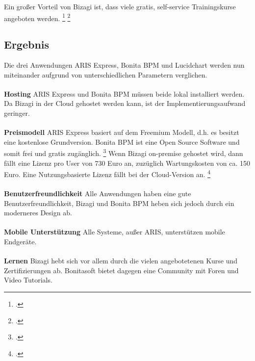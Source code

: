 Ein großer Vorteil von Bizagi ist, dass viele gratis, self-service
Trainingskurse angeboten werden. \footcite{bizagiproscons}
\footcite{bizagilernen}


\subsection{Ergebnis}

Die drei Anwendungen ARIS Express, Bonita BPM und Lucidchart werden nun
miteinander aufgrund von unterschiedlichen Parametern verglichen.
\\
\\
\textbf{Hosting} ARIS Express und Bonita BPM müssen beide lokal installiert
werden. Da Bizagi in der Cloud gehostet werden kann, ist der
Implementierungsaufwand geringer.
\\
\\
\textbf{Preismodell} ARIS Express basiert  auf dem Freemium
Modell, d.h. es besitzt eine kostenlose Grundversion. Bonita BPM ist eine Open
Source Software und somit frei und gratis zugänglich. \footcite{bonitasource}
Wenn Bizagi on-premise gehostet wird, dann fällt eine Lizenz pro User von 730 Euro an, zuzüglich
Wartungskosten von ca. 150 Euro. Eine Nutzungsbasierte Lizenz fällt bei der
Cloud-Version an. \footcite{bizagiprizing}
\\
\\
\textbf{Benutzerfreundlichkeit} Alle Anwendungen haben eine gute
Benutzerfreundlichkeit, Bizagi und Bonita BPM heben sich jedoch durch ein
moderneres Design ab.
\\
\\
\textbf{Mobile Unterstützung} Alle Systeme, außer ARIS, unterstützen mobile
Endgeräte.
\\
\\
\textbf{Lernen} Bizagi hebt sich vor allem durch die vielen angebotetenen Kurse
und Zertifizierungen ab. Bonitasoft bietet dagegen eine Community mit Foren und
Video Tutorials.


